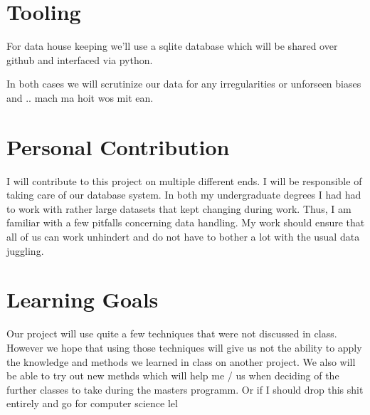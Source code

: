 \documentclass[11pt,a4paper]{article}
\begin{document}
\section{Tooling}
For data house keeping we'll use a sqlite database which will be shared over github and interfaced via python. 

In both cases we will scrutinize %
our data for any irregularities or unforseen biases and .. mach ma hoit wos mit ean.


\section{Personal Contribution}

I will contribute to this project on multiple different ends. I will be responsible of taking care of our database system. In both my undergraduate degrees I had had to work with rather large datasets that kept changing during work. Thus, I am familiar with a few pitfalls concerning data handling. My work should ensure that all of us can work unhindert and do not have to bother a lot with the usual data juggling. 

\section{Learning Goals}

Our project will use quite a few techniques that were not discussed in class. However we hope that using those techniques will give us not the ability to apply the knowledge and methods we learned in class on another project. We also will be able to try out new methds which will help me / us when deciding of the further classes to take during the masters programm. Or if I should drop this shit entirely and go for computer science lel
\end{document}
